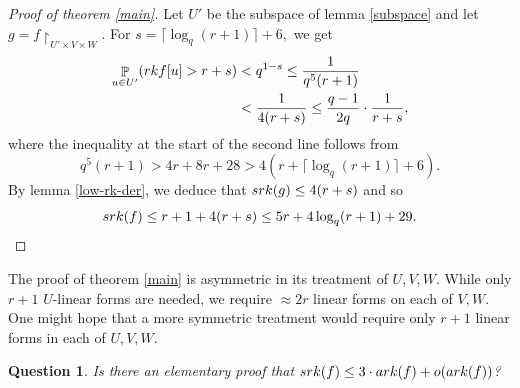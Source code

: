 \documentclass{daj}
\newtheorem{question}[theorem]{Question}
\renewcommand{\P}{\mathop{\mathbb{P}}}
\newcommand{\rk}{\textnormal{rk}}
\newcommand{\ark}{\textnormal{ark}}
\newcommand{\srk}{\textnormal{srk}}
\begin{document}
    \begin{proof}[Proof of theorem \ref{main}]
    Let $U'$ be the subspace of lemma \ref{subspace} and let \linebreak $g = f\restriction_{U'\times V\times W}.$ For $s = \lceil\log_q (r+1)\rceil+6,$ we get 
    \begin{align*}
        \P_{u\in U'} (\rk f[u] > r+s) &< q^{1-s} \le \frac{1}{q^5(r+1)}  \\
        &< \frac{1}{4(r+s)} \le \frac{q-1}{2q}\cdot \frac{1}{r+s},
    \end{align*}
    where the inequality at the start of the second line follows from 
    \[
    q^5(r+1) > 4r+8r+28 > 4(r+\lceil\log_q (r+1)\rceil+6).
    \]
    By lemma \ref{low-rk-der}, we deduce that $\srk(g) \le 4(r+s) $ and so
    \[
    \srk(f) \le r+1+4(r+s) \le 5r+4\log_q(r+1)+29.
    \]
    \end{proof}

    The proof of theorem \ref{main} is asymmetric in its treatment of $U,V,W.$ While only $r+1$ $U$-linear forms are needed, we require $\approx 2r$ linear forms on each of $V,W.$ One might hope that a more symmetric treatment would require only $r+1$ linear forms in each of $U,V,W.$

    \begin{question}
        Is there an elementary proof that $\srk(f) \le 3\cdot \ark(f)+o(\ark(f))$? 
    \end{question}




\end{document}
